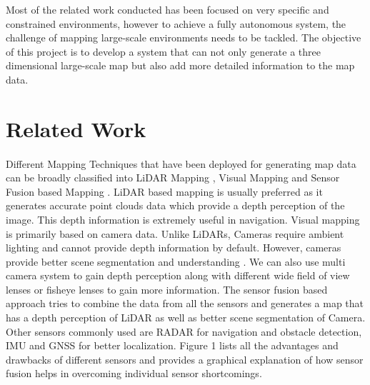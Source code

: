 \documentclass{article}
\begin{document}
		Most of the related work conducted has been focused on very specific and constrained environments, however to achieve a fully autonomous system, the challenge of mapping large-scale environments needs to be tackled. The objective of this project is to develop a system that can not only generate a three dimensional large-scale map but also add more detailed information to the map data.
	

	
	\section{Related Work}
		\paragraph{}
		Different Mapping Techniques that have been deployed for generating map data can be broadly classified into 
		LiDAR Mapping
		\cite{levinson_robust_2010},
		Visual Mapping
		\cite{chen_combining_2017}
		and Sensor Fusion based Mapping
		\cite{silva_fusion_nodate}. 
		LiDAR based mapping is usually preferred as it generates accurate point clouds data which provide a depth perception of the image. This depth information is extremely useful in navigation. Visual mapping is primarily based on camera data. Unlike LiDARs, Cameras require ambient lighting and cannot provide depth information by default. However, cameras provide better scene segmentation and understanding
		\cite{heng_project_2018}.
		We can also use multi camera system
		\cite{geiger_stereoscan:_2011}
		to gain depth perception along with different wide field of view lenses or fisheye lenses
		\cite{cui_real-time_2018}
		to gain more information.
		The sensor fusion based approach tries to combine the data from all the sensors and generates a map that has a depth perception of LiDAR as well as better scene segmentation of Camera. Other sensors commonly used are RADAR for navigation and obstacle detection, IMU and GNSS for better localization.
		Figure 1 lists all the advantages and drawbacks of different sensors and provides a graphical explanation of how sensor fusion helps in overcoming individual sensor shortcomings.
	
\end{document}
